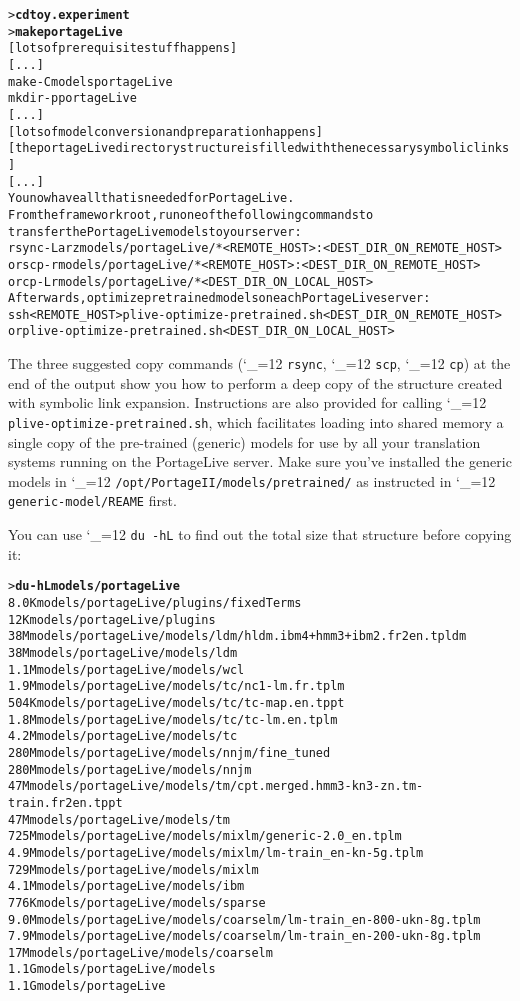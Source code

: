 \documentclass[11pt,letterpaper]{article}
\def\code{\begingroup\catcode`\_=12 \codex}
\newcommand{\codex}[1]{\texttt{#1}\endgroup}
\begin{document}
\begin{small}
\begin{alltt}
   > \textbf{cd toy.experiment}
   > \textbf{make portageLive}
   [lots of prerequisite stuff happens]
   [...]
   make -C models portageLive
   mkdir -p portageLive
   [...]
   [lots of model conversion and preparation happens]
   [the portageLive directory structure is filled with the necessary symbolic links]
   [...]
   You now have all that is needed for PortageLive.
   From the framework root, run one of the following commands to
   transfer the PortageLive models to your server:
        rsync -Larz models/portageLive/* <REMOTE_HOST>:<DEST_DIR_ON_REMOTE_HOST>
   or   scp -r models/portageLive/* <REMOTE_HOST>:<DEST_DIR_ON_REMOTE_HOST>
   or   cp -Lr models/portageLive/* <DEST_DIR_ON_LOCAL_HOST>
   Afterwards, optimize pretrained models on each PortageLive server:
        ssh <REMOTE_HOST> plive-optimize-pretrained.sh <DEST_DIR_ON_REMOTE_HOST>
   or   plive-optimize-pretrained.sh <DEST_DIR_ON_LOCAL_HOST>
\end{alltt}
\end{small}

The three suggested copy commands (\code{rsync}, \code{scp}, \code{cp}) at the end of the
output show you how to perform a deep copy
of the structure created with symbolic link expansion.
Instructions are also provided for calling \code{plive-optimize-pretrained.sh},
which facilitates loading into shared memory a single copy of the pre-trained
(generic) models for use by all your translation systems running on the
PortageLive server.
Make sure you've installed the generic models in \code{/opt/PortageII/models/pretrained/} as instructed in
\code{generic-model/REAME} first.

You can use \code{du -hL} to find out the total size that structure before copying it:
\begin{small}
\begin{alltt}
   > \textbf{du -hL models/portageLive}
   8.0K    models/portageLive/plugins/fixedTerms
   12K     models/portageLive/plugins
   38M     models/portageLive/models/ldm/hldm.ibm4+hmm3+ibm2.fr2en.tpldm
   38M     models/portageLive/models/ldm
   1.1M    models/portageLive/models/wcl
   1.9M    models/portageLive/models/tc/nc1-lm.fr.tplm
   504K    models/portageLive/models/tc/tc-map.en.tppt
   1.8M    models/portageLive/models/tc/tc-lm.en.tplm
   4.2M    models/portageLive/models/tc
   280M    models/portageLive/models/nnjm/fine_tuned
   280M    models/portageLive/models/nnjm
   47M     models/portageLive/models/tm/cpt.merged.hmm3-kn3-zn.tm-train.fr2en.tppt
   47M     models/portageLive/models/tm
   725M    models/portageLive/models/mixlm/generic-2.0_en.tplm
   4.9M    models/portageLive/models/mixlm/lm-train_en-kn-5g.tplm
   729M    models/portageLive/models/mixlm
   4.1M    models/portageLive/models/ibm
   776K    models/portageLive/models/sparse
   9.0M    models/portageLive/models/coarselm/lm-train_en-800-ukn-8g.tplm
   7.9M    models/portageLive/models/coarselm/lm-train_en-200-ukn-8g.tplm
   17M     models/portageLive/models/coarselm
   1.1G    models/portageLive/models
   1.1G    models/portageLive
\end{alltt}
\end{small}
\end{document}
